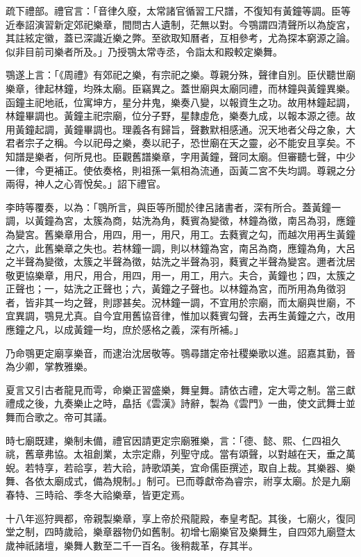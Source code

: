 疏下禮部。禮官言：「音律久廢，太常諸官循習工尺譜，不復知有黃鐘等調。臣等近奉詔演習新定郊祀樂章，間問古人遺制，茫無以對。今鶚謂四清聲所以為旋宮，其註絃定徽，蓋已深識近樂之弊。至欲取知曆者，互相參考，尤為探本窮源之論。似非目前司樂者所及。」乃授鶚太常寺丞，令詣太和殿較定樂舞。

鶚遂上言：「《周禮》有郊祀之樂，有宗祀之樂。尊親分殊，聲律自別。臣伏聽世廟樂章，律起林鐘，均殊太廟。臣竊異之。蓋世廟與太廟同禮，而林鐘與黃鐘異樂。函鐘主祀地祇，位寓坤方，星分井鬼，樂奏八變，以報資生之功。故用林鐘起調，林鐘畢調也。黃鐘主祀宗廟，位分子野，星隸虛危，樂奏九成，以報本源之德。故用黃鐘起調，黃鐘畢調也。理義各有歸旨，聲數默相感通。況天地者父母之象，大君者宗子之稱。今以祀母之樂，奏以祀子，恐世廟在天之靈，必不能安且享矣。不知譜是樂者，何所見也。臣觀舊譜樂章，字用黃鐘，聲同太廟。但審聽七聲，中少一律，今更補正。使依奏格，則祖孫一氣相為流通，函黃二宮不失均調。尊親之分兩得，神人之心胥悅矣。」詔下禮官。

李時等覆奏，以為：「鶚所言，與臣等所聞於律呂諸書者，深有所合。蓋黃鐘一調，以黃鐘為宮，太簇為商，姑洗為角，蕤賓為變徵，林鐘為徵，南呂為羽，應鐘為變宮。舊樂章用合，用四，用一，用尺，用工。去蕤賓之勾，而越次用再生黃鐘之六，此舊樂章之失也。若林鐘一調，則以林鐘為宮，南呂為商，應鐘為角，大呂之半聲為變徵，太簇之半聲為徵，姑洗之半聲為羽，蕤賓之半聲為變宮。邇者沈居敬更協樂章，用尺，用合，用四，用一，用工，用六。夫合，黃鐘也；四，太簇之正聲也；一，姑洗之正聲也；六，黃鐘之子聲也。以林鐘為宮，而所用為角徵羽者，皆非其一均之聲，則謬甚矣。況林鐘一調，不宜用於宗廟，而太廟與世廟，不宜異調，鶚見尤真。自今宜用舊協音律，惟加以蕤賓勾聲，去再生黃鐘之六，改用應鐘之凡，以成黃鐘一均，庶於感格之義，深有所補。」

乃命鶚更定廟享樂音，而逮治沈居敬等。鶚尋譜定帝社稷樂歌以進。詔嘉其勤，晉為少卿，掌教雅樂。

夏言又引古者龍見而雩，命樂正習盛樂，舞皇舞。請依古禮，定大雩之制。當三獻禮成之後，九奏樂止之時，皛括《雲漢》詩辭，製為《雲門》一曲，使文武舞士並舞而合歌之。帝可其議。

時七廟既建，樂制未備，禮官因請更定宗廟雅樂，言：「德、懿、熙、仁四祖久祧，舊章弗協。太祖創業，太宗定鼎，列聖守成。當有頌聲，以對越在天，垂之萬蜺。若特享，若祫享，若大祫，詩歌頌美，宜命儒臣撰述，取自上裁。其樂器、樂舞、各依太廟成式，備為規制。」制可。已而尊獻帝為睿宗，祔享太廟。於是九廟春特、三時祫、季冬大祫樂章，皆更定焉。

十八年巡狩興都，帝親製樂章，享上帝於飛龍殿，奉皇考配。其後，七廟火，復同堂之制，四時歲祫，樂章器物仍如舊制。初增七廟樂官及樂舞生，自四郊九廟暨太歲神祇諸壇，樂舞人數至二千一百名。後稍裁革，存其半。

